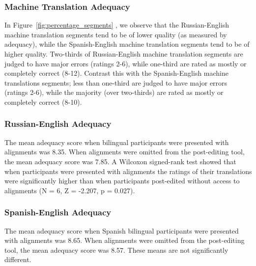\subsubsection{Machine Translation Adequacy}

In Figure~\ref{fig:percentage_segments} , we observe that the Russian-English machine translation segments tend to be of lower quality (as measured by adequacy), while the Spanish-English machine translation segments tend to be of higher quality.
%
Two-thirds of Russian-English machine translation segments are judged to have major errors (ratings 2-6), while one-third are rated as mostly or completely correct (8-12).
%
Contrast this with the Spanish-English machine translations segments; 
%
less than one-third are judged to have major errors (ratings 2-6), while the majority (over two-thirds) are rated as mostly or completely correct (8-10).




\subsubsection{Russian-English Adequacy}


The mean adequacy score when bilingual participants were presented with alignments was 8.35.
%
When alignments were omitted from the post-editing tool, the mean adequacy score was 7.85.  
%
A Wilcoxon signed-rank test \citep{1945_Wilcoxon} showed that when participants were presented with alignments the ratings of their translations were significantly higher than when participants post-edited without access to alignments (N = 6, Z = -2.207, p = 0.027).



\subsubsection{Spanish-English Adequacy}

The mean adequacy score when Spanish bilingual participants were presented with alignments was 8.65. When alignments were omitted from the post-editing tool, the mean adequacy score was 8.57. These means are not significantly different.



%

